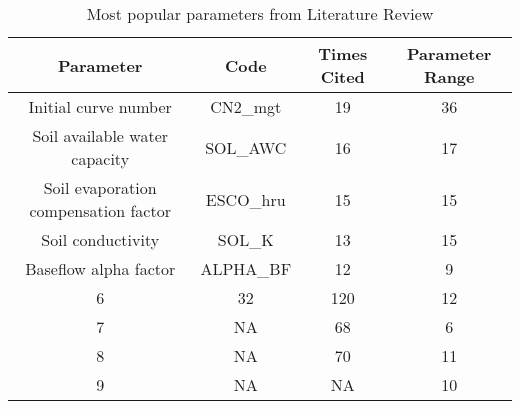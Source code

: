 	\begin{table}[h!]
	\caption[Most popular parameters]{Most popular parameters from Literature Review}
	\centering
		\begin{tabular}{c c c c}
			\hline 
			Parameter	 & 	Code		 & 	Times Cited	 & 	Parameter Range \\
			\hline \hline
			Initial curve number & CN2_mgt		& 19	& 36  \\
			Soil available water capacity & SOL_AWC	& 16		& 17  \\
			Soil evaporation compensation factor & ESCO_hru	& 15		& 15  \\
			Soil conductivity & SOL_K	& 13		& 15  \\
			Baseflow alpha factor & ALPHA_BF	&	12		& 9   \\
			6 & 32	& 120		& 12  \\
			7 & NA	& 68		& 6   \\
			8 & NA	& 70		& 11  \\
			9 & NA	& NA  		& 10  \\
			\hline		
		\end{tabular}
		
		\label{table:soil_clust}
	\end{table}